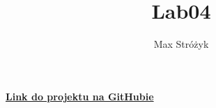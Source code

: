 \documentclass[a4paper, 11pt]{article}
\title{Lab04}
\author{Max Stróżyk}
\begin{document}
\maketitle
\tableofcontents
\begin{center}
    \href{https://github.com/maxi7524/numerical-methods}{\textbf{Link do projektu na GitHubie}}
\end{center}



\newpage




\newpage



\newpage




\newpage






% 
\end{document}
